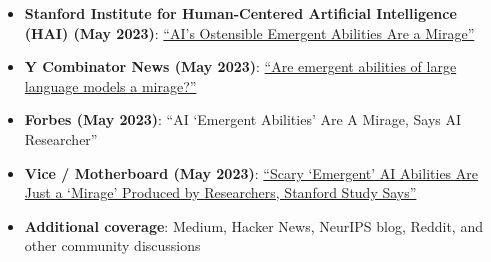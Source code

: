 \documentclass{article}
\newenvironment{changemargin}[2]{%
  \begin{list}{}{%
    \setlength{\topsep}{0pt}%
    \setlength{\leftmargin}{#1}%
    \setlength{\rightmargin}{#2}%
    \setlength{\listparindent}{\parindent}%
    \setlength{\itemindent}{\parindent}%
    \setlength{\parsep}{\parskip}%
  }%
  \item[]}{\end{list}
}
\newenvironment{body} {
		\vspace*{-16pt}
		\begin{changemargin}{-0.25in}{-0.5in}
	  }
		{\end{changemargin}\vspace{8pt plus 12pt}
	}
\begin{document}
\begin{body}
\begin{itemize}
    \item \textbf{Stanford Institute for Human-Centered Artificial Intelligence (HAI) (May 2023)}: \href{https://hai.stanford.edu/news/ais-ostensible-emergent-abilities-are-mirage}{``AI's Ostensible Emergent Abilities Are a Mirage''}
    \item \textbf{Y Combinator News (May 2023)}: \href{https://news.ycombinator.com/item?id=35768824}{``Are emergent abilities of large language models a mirage?''}
    \item \textbf{Forbes (May 2023)}: ``AI `Emergent Abilities' Are A Mirage, Says AI Researcher''
    \item \textbf{Vice / Motherboard (May 2023)}: \href{https://www.vice.com/en/article/scary-emergent-ai-abilities-are-just-a-mirage-produced-by-researchers-stanford-study-says/}{``Scary `Emergent' AI Abilities Are Just a `Mirage' Produced by Researchers, Stanford Study Says''}
    \item \textbf{Additional coverage}: Medium, Hacker News, NeurIPS blog, Reddit, and other community discussions
\end{itemize}
\end{body}

\end{document}
